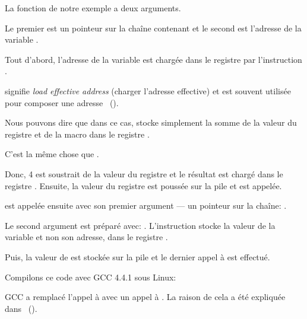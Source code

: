 La fonction \scanf de notre exemple a deux arguments.

Le premier est un pointeur sur la chaîne contenant  et le second est l'adresse
de la variable .

Tout d'abord, l'adresse de la variable  est chargée dans le registre \EAX
par l'instruction \\ .

\LEA signifie \emph{load effective address} (charger l'adresse effective) et est souvent
utilisée pour composer une adresse ~().

Nous pouvons dire que dans ce cas, \LEA stocke simplement la somme de la valeur du
registre \EBP et de la macro  dans le registre \EAX.

C'est la même chose que .

Donc, 4 est soustrait de la valeur du registre \EBP et le résultat est chargé dans
le registre \EAX.
Ensuite, la valeur du registre \EAX est poussée sur la pile et \scanf est appelée.

\printf est appelée ensuite avec son premier argument --- un pointeur sur la chaîne:
.

Le second argument est préparé avec: .
L'instruction stocke la valeur de la variable  et non son adresse, dans le
registre \ECX.

Puis, la valeur de \ECX est stockée sur la pile et le dernier appel à \printf
est effectué.




Compilons ce code avec GCC 4.4.1 sous Linux:



GCC a remplacé l'appel à \printf avec un appel à \puts. La raison de cela a été
expliquée dans ~().

% 

